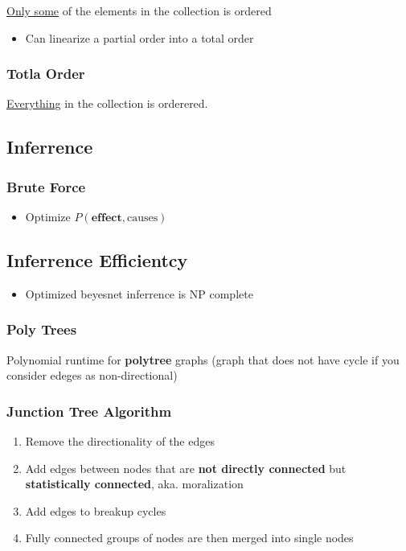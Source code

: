       \ul{Only some} of the elements in the collection is ordered

      \begin{itemize}
        \item Can linearize a partial order into a total order
      \end{itemize}

    \subsubsection{Totla Order}

      \ul{Everything} in the collection is orderered.

  \subsection{Inferrence}

    \subsubsection{Brute Force}

      \begin{itemize}
        \item Optimize $ P\left( \textbf{effect}, \text{causes} \right) $
      \end{itemize}

  \subsection{Inferrence Efficientcy}

    \begin{itemize}
      \item Optimized beyesnet inferrence is NP complete
    \end{itemize}

    \subsubsection{Poly Trees}

      Polynomial runtime for \textbf{polytree} graphs (graph that does not have
      cycle if you consider edeges as non-directional)

    \subsubsection{Junction Tree Algorithm}

      \begin{enumerate}
        \item Remove the directionality of the edges
        \item Add edges between nodes that are \textbf{not directly connected}
        but \textbf{statistically connected}, aka. moralization
        \item Add edges to breakup cycles
        \item Fully connected groups of nodes are then merged into single nodes
      \end{enumerate}

